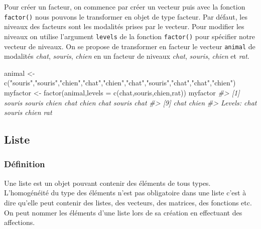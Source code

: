 \documentclass[
]{book}
\newenvironment{Shaded}{\begin{snugshade}}{\end{snugshade}}
\newcommand{\AttributeTok}[1]{\textcolor[rgb]{0.77,0.63,0.00}{#1}}
\newcommand{\CommentTok}[1]{\textcolor[rgb]{0.56,0.35,0.01}{\textit{#1}}}
\newcommand{\FunctionTok}[1]{\textcolor[rgb]{0.00,0.00,0.00}{#1}}
\newcommand{\NormalTok}[1]{#1}
\newcommand{\OtherTok}[1]{\textcolor[rgb]{0.56,0.35,0.01}{#1}}
\newcommand{\StringTok}[1]{\textcolor[rgb]{0.31,0.60,0.02}{#1}}
\theoremstyle{definition}
\theoremstyle{definition}
\theoremstyle{definition}
\theoremstyle{definition}
\theoremstyle{remark}
\begin{document}
Pour créer un facteur, on commence par créer un vecteur puis avec la fonction \texttt{factor()} nous pouvons le transformer en objet de type facteur. Par défaut, les niveaux des facteurs sont les modalités prises par le vecteur. Pour modifier les niveaux on utilise l'argument \texttt{levels} de la fonction \texttt{factor()} pour spécifier notre vecteur de niveaux.
On se propose de transformer en facteur le vecteur \texttt{animal} de modalités \emph{chat}, \emph{souris}, \emph{chien} en un facteur de niveaux \emph{chat}, \emph{souris}, \emph{chien} et \emph{rat}.

\begin{Shaded}
\begin{Highlighting}[]
\NormalTok{animal }\OtherTok{\textless{}{-}} \FunctionTok{c}\NormalTok{(}\StringTok{"souris"}\NormalTok{,}\StringTok{"souris"}\NormalTok{,}\StringTok{"chien"}\NormalTok{,}\StringTok{"chat"}\NormalTok{,}\StringTok{"chien"}\NormalTok{,}\StringTok{"chat"}\NormalTok{,}\StringTok{"souris"}\NormalTok{,}\StringTok{"chat"}\NormalTok{,}\StringTok{"chat"}\NormalTok{,}\StringTok{"chien"}\NormalTok{)}
\NormalTok{myfactor }\OtherTok{\textless{}{-}} \FunctionTok{factor}\NormalTok{(animal,}\AttributeTok{levels =} \FunctionTok{c}\NormalTok{(}\StringTok{\textquotesingle{}chat\textquotesingle{}}\NormalTok{,}\StringTok{\textquotesingle{}souris\textquotesingle{}}\NormalTok{,}\StringTok{\textquotesingle{}chien\textquotesingle{}}\NormalTok{,}\StringTok{\textquotesingle{}rat\textquotesingle{}}\NormalTok{))}
\NormalTok{myfactor}
\CommentTok{\#\textgreater{}  [1] souris souris chien  chat   chien  chat   souris chat  }
\CommentTok{\#\textgreater{}  [9] chat   chien }
\CommentTok{\#\textgreater{} Levels: chat souris chien rat}
\end{Highlighting}
\end{Shaded}

\hypertarget{list}{%
\subsection{Liste}\label{list}}

\hypertarget{duxe9finition-2}{%
\subsubsection*{Définition}\label{duxe9finition-2}}

Une liste est un objet pouvant contenir des éléments de tous types. L'homogénéité du type des éléments n'est pas obligatoire dans une liste c'est à dire qu'elle peut contenir des listes, des vecteurs, des matrices, des fonctions etc. On peut nommer les éléments d'une liste lors de sa création en effectuant des affections.
\end{document}
